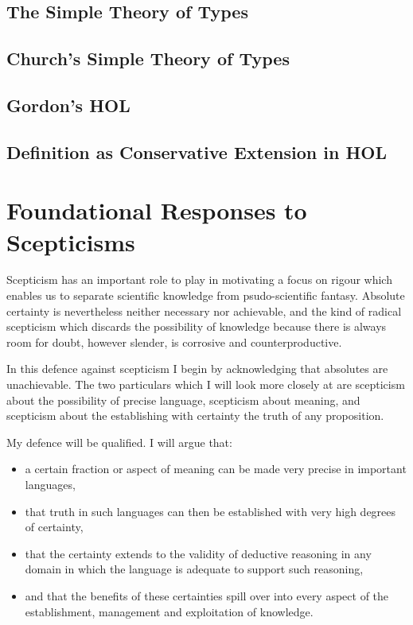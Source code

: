 \documentclass[10pt,titlepage]{book}
\begin{document}
\section{The Simple Theory of Types}

\section{Church's Simple Theory of Types}

\section{Gordon's HOL}

\section{Definition as Conservative Extension in HOL}

\chapter{Foundational Responses to Scepticisms}\label{ChapFRS}

Scepticism has an important role to play in motivating a focus on rigour which enables us to separate scientific knowledge from psudo-scientific fantasy.
Absolute certainty is nevertheless neither necessary nor achievable, and the kind of radical scepticism which discards the possibility of knowledge because there is always room for doubt, however slender, is corrosive and counterproductive.

In this defence against scepticism I begin by acknowledging that absolutes are unachievable.
The two particulars which I will look more closely at are scepticism about the possibility of precise language, scepticism about meaning, and scepticism about the establishing with certainty the truth of any proposition.

My defence will be qualified.
I will argue that:
\begin{itemize}
\item a certain fraction or aspect of meaning can be made very precise in important languages,
\item that truth in such languages can then be established with very high degrees of certainty,
\item that the certainty extends to the validity of deductive reasoning in any domain in which the language is adequate to support such reasoning,
\item and that the benefits of these certainties spill over into every aspect of the establishment, management and exploitation of knowledge.
\end{itemize}
\end{document}
